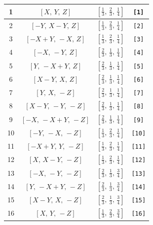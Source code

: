 \documentclass[fleqn,8pt]{jsarticle}
\begin{document}
\begin{longtable}{cccc}
1 & $\left[ X,\, Y,\, Z \right]$ & $\left[ \frac{1}{3},\, \frac{2}{3},\, \frac{1}{4} \right]$ & {\tt [1]} \\ \hline
2 & $\left[ - Y,\, X - Y,\, Z \right]$ & $\left[ \frac{1}{3},\, \frac{2}{3},\, \frac{1}{4} \right]$ & {\tt [2]} \\ \hline
3 & $\left[ - X + Y,\, - X,\, Z \right]$ & $\left[ \frac{1}{3},\, \frac{2}{3},\, \frac{1}{4} \right]$ & {\tt [3]} \\ \hline
4 & $\left[ - X,\, - Y,\, Z \right]$ & $\left[ \frac{2}{3},\, \frac{1}{3},\, \frac{1}{4} \right]$ & {\tt [4]} \\ \hline
5 & $\left[ Y,\, - X + Y,\, Z \right]$ & $\left[ \frac{2}{3},\, \frac{1}{3},\, \frac{1}{4} \right]$ & {\tt [5]} \\ \hline
6 & $\left[ X - Y,\, X,\, Z \right]$ & $\left[ \frac{2}{3},\, \frac{1}{3},\, \frac{1}{4} \right]$ & {\tt [6]} \\ \hline
7 & $\left[ Y,\, X,\, - Z \right]$ & $\left[ \frac{2}{3},\, \frac{1}{3},\, \frac{1}{4} \right]$ & {\tt [7]} \\ \hline
8 & $\left[ X - Y,\, - Y,\, - Z \right]$ & $\left[ \frac{2}{3},\, \frac{1}{3},\, \frac{1}{4} \right]$ & {\tt [8]} \\ \hline
9 & $\left[ - X,\, - X + Y,\, - Z \right]$ & $\left[ \frac{2}{3},\, \frac{1}{3},\, \frac{1}{4} \right]$ & {\tt [9]} \\ \hline
10 & $\left[ - Y,\, - X,\, - Z \right]$ & $\left[ \frac{1}{3},\, \frac{2}{3},\, \frac{1}{4} \right]$ & {\tt [10]} \\ \hline
11 & $\left[ - X + Y,\, Y,\, - Z \right]$ & $\left[ \frac{1}{3},\, \frac{2}{3},\, \frac{1}{4} \right]$ & {\tt [11]} \\ \hline
12 & $\left[ X,\, X - Y,\, - Z \right]$ & $\left[ \frac{1}{3},\, \frac{2}{3},\, \frac{1}{4} \right]$ & {\tt [12]} \\ \hline
13 & $\left[ - X,\, - Y,\, - Z \right]$ & $\left[ \frac{2}{3},\, \frac{1}{3},\, \frac{3}{4} \right]$ & {\tt [13]} \\ \hline
14 & $\left[ Y,\, - X + Y,\, - Z \right]$ & $\left[ \frac{2}{3},\, \frac{1}{3},\, \frac{3}{4} \right]$ & {\tt [14]} \\ \hline
15 & $\left[ X - Y,\, X,\, - Z \right]$ & $\left[ \frac{2}{3},\, \frac{1}{3},\, \frac{3}{4} \right]$ & {\tt [15]} \\ \hline
16 & $\left[ X,\, Y,\, - Z \right]$ & $\left[ \frac{1}{3},\, \frac{2}{3},\, \frac{3}{4} \right]$ & {\tt [16]} \\ \hline

\end{longtable}
\end{document}
